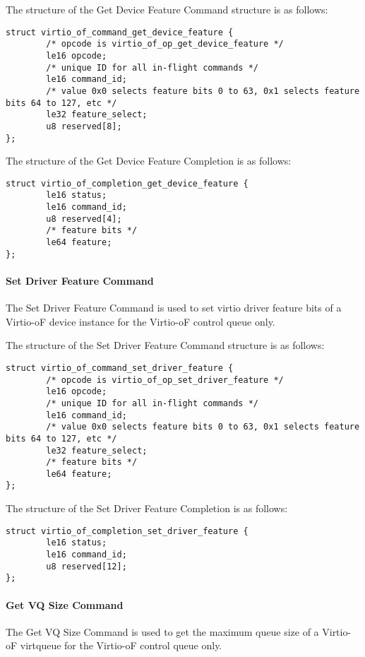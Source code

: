 The structure of the Get Device Feature Command structure is as follows:
\begin{lstlisting}
struct virtio_of_command_get_device_feature {
        /* opcode is virtio_of_op_get_device_feature */
        le16 opcode;
        /* unique ID for all in-flight commands */
        le16 command_id;
        /* value 0x0 selects feature bits 0 to 63, 0x1 selects feature bits 64 to 127, etc */
        le32 feature_select;
        u8 reserved[8];
};
\end{lstlisting}

The structure of the Get Device Feature Completion is as follows:
\begin{lstlisting}
struct virtio_of_completion_get_device_feature {
        le16 status;
        le16 command_id;
        u8 reserved[4];
        /* feature bits */
        le64 feature;
};
\end{lstlisting}

\paragraph{Set Driver Feature Command}\label{sec:Virtio Transport Options / Virtio Over Fabrics / Commands Definition / Opcodes / Set Driver Feature Command}
The Set Driver Feature Command is used to set virtio driver feature bits of a Virtio-oF device instance for the Virtio-oF control queue only.

The structure of the Set Driver Feature Command structure is as follows:
\begin{lstlisting}
struct virtio_of_command_set_driver_feature {
        /* opcode is virtio_of_op_set_driver_feature */
        le16 opcode;
        /* unique ID for all in-flight commands */
        le16 command_id;
        /* value 0x0 selects feature bits 0 to 63, 0x1 selects feature bits 64 to 127, etc */
        le32 feature_select;
        /* feature bits */
        le64 feature;
};
\end{lstlisting}

The structure of the Set Driver Feature Completion is as follows:
\begin{lstlisting}
struct virtio_of_completion_set_driver_feature {
        le16 status;
        le16 command_id;
        u8 reserved[12];
};
\end{lstlisting}

\paragraph{Get VQ Size Command}\label{sec:Virtio Transport Options / Virtio Over Fabrics / Commands Definition / Opcodes / Get VQ Size Command}
The Get VQ Size Command is used to get the maximum queue size of a Virtio-oF virtqueue for the Virtio-oF control queue only.

